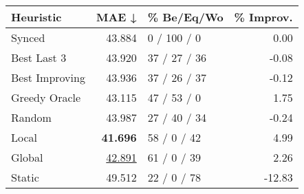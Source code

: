 \begin{tabular}{lrlr}
\toprule
\textbf{Heuristic} & \textbf{MAE ↓} & \textbf{\% Be/Eq/Wo} & \textbf{\% Improv.} \\
\midrule
            Synced &         43.884 &          0 / 100 / 0 &                0.00 \\
\midrule
       Best Last 3 &         43.920 &         37 / 27 / 36 &               -0.08 \\
    Best Improving &         43.936 &         37 / 26 / 37 &               -0.12 \\
\addlinespace
     Greedy Oracle &         43.115 &          47 / 53 / 0 &                1.75 \\
            Random &         43.987 &         27 / 40 / 34 &               -0.24 \\
\midrule
             Local &         \textbf{41.696} &          58 / 0 / 42 &                4.99 \\
            Global &         \underline{42.891} &          61 / 0 / 39 &                2.26 \\
\midrule
            Static &         49.512 &          22 / 0 / 78 &              -12.83 \\
\bottomrule
\end{tabular}

\label{tab:non_lr05_le1_bs4_Summary}
